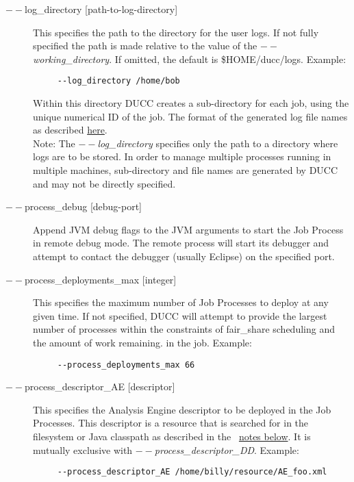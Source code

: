 \begin{description}
           \item[$--$log\_directory {[path-to-log-directory]} ]
             This specifies the path to the directory for the user logs. 
             If not fully specified the path is made relative to the value of the {\em $--$working\_directory}.
             If omitted, the default is \$HOME/ducc/logs. 
             Example: 
             \begin{verbatim}
     --log_directory /home/bob
             \end{verbatim}
             Within this directory DUCC creates a sub-directory for each job, using the unique numerical 
             ID of the job. The format of the generated log file names as described
             \hyperref[chap:job-logs]{here}.
             \\Note: The {\em $--$log\_directory} specifies only the path to a directory where 
             logs are to be stored. In order to manage multiple processes running in multiple 
             machines, sub-directory and file names are generated by DUCC and may 
             not be directly specified. 

           \item[$--$process\_debug {[debug-port]}] Append JVM debug flags to the JVM
             arguments to start the Job Process in remote debug mode.  The remote process will start
             its debugger and attempt to contact the debugger (usually Eclipse) on the specified
             port.
             
           \item[$--$process\_deployments\_max {[integer]} ]
             This specifies the maximum number of Job Processes to deploy at any given time. If not 
             specified, DUCC will attempt to provide the largest number of processes within the 
             constraints of fair\_share scheduling and the amount of work remaining.
             in the job. Example:
             \begin{verbatim}
     --process_deployments_max 66
             \end{verbatim}

           \item[$--$process\_descriptor\_AE {[descriptor]}  ]
             This specifies the Analysis Engine descriptor to be deployed in the Job Processes. This 
             descriptor is a resource that is searched for in the filesystem or Java classpath as described 
             in the ~\hyperref[par:cli.submit.notes]{notes below}.
             It is mutually exclusive with {\em $--$process\_descriptor\_DD}.
             Example: 
             \begin{verbatim}
     --process_descriptor_AE /home/billy/resource/AE_foo.xml
             \end{verbatim}



\end{description}
